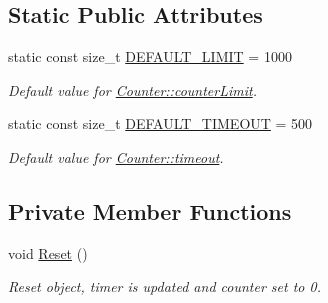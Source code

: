 \subsection*{Static Public Attributes}
\begin{DoxyCompactItemize}
\item 
\hypertarget{class_counter_afb1e707a0aebc387eb4dd248385d5af0}{
static const size\_\-t \hyperlink{class_counter_afb1e707a0aebc387eb4dd248385d5af0}{DEFAULT\_\-LIMIT} = 1000}
\label{class_counter_afb1e707a0aebc387eb4dd248385d5af0}

\begin{DoxyCompactList}\small\item\em Default value for \hyperlink{class_counter_a3fcc72a60f11ec2d1cdbfee9c9972a69}{Counter::counterLimit}. \item\end{DoxyCompactList}\item 
\hypertarget{class_counter_ac1904c97828edeb3cec6a88d29570ea7}{
static const size\_\-t \hyperlink{class_counter_ac1904c97828edeb3cec6a88d29570ea7}{DEFAULT\_\-TIMEOUT} = 500}
\label{class_counter_ac1904c97828edeb3cec6a88d29570ea7}

\begin{DoxyCompactList}\small\item\em Default value for \hyperlink{class_counter_aaf8311a4c0e6608e29b4b73815ca4e59}{Counter::timeout}. \item\end{DoxyCompactList}\end{DoxyCompactItemize}
\subsection*{Private Member Functions}
\begin{DoxyCompactItemize}
\item 
\hypertarget{class_counter_a006032d39fada9ad683ccc849d2f60d3}{
void \hyperlink{class_counter_a006032d39fada9ad683ccc849d2f60d3}{Reset} ()}
\label{class_counter_a006032d39fada9ad683ccc849d2f60d3}

\begin{DoxyCompactList}\small\item\em Reset object, timer is updated and counter set to 0. \item\end{DoxyCompactList}\end{DoxyCompactItemize}
